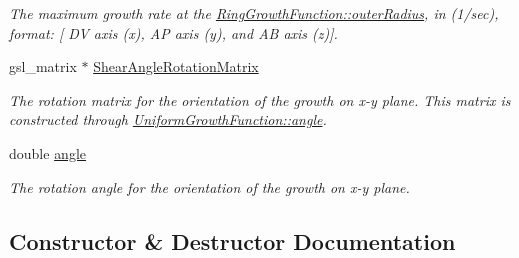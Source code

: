 \begin{DoxyCompactItemize}
\begin{DoxyCompactList}\small\item\em The maximum growth rate at the \hyperlink{classRingGrowthFunction_a8b7d5268d9d47f112b56feef58193649}{Ring\+Growth\+Function\+::outer\+Radius}, in (1/sec), format\+: \mbox{[} D\+V axis (x), A\+P axis (y), and A\+B axis (z)\mbox{]}. \end{DoxyCompactList}\item 
\hypertarget{classRingGrowthFunction_a9603e5de21f7bca0c23deff2c1e9efd6}{}gsl\+\_\+matrix $\ast$ \hyperlink{classRingGrowthFunction_a9603e5de21f7bca0c23deff2c1e9efd6}{Shear\+Angle\+Rotation\+Matrix}\label{classRingGrowthFunction_a9603e5de21f7bca0c23deff2c1e9efd6}

\begin{DoxyCompactList}\small\item\em The rotation matrix for the orientation of the growth on x-\/y plane. This matrix is constructed through \hyperlink{classUniformGrowthFunction_a1a985ff52f9796688e00942b4d3349f8}{Uniform\+Growth\+Function\+::angle}. \end{DoxyCompactList}\item 
\hypertarget{classRingGrowthFunction_add6283d1ad999925c4202a3fa66b76ea}{}double \hyperlink{classRingGrowthFunction_add6283d1ad999925c4202a3fa66b76ea}{angle}\label{classRingGrowthFunction_add6283d1ad999925c4202a3fa66b76ea}

\begin{DoxyCompactList}\small\item\em The rotation angle for the orientation of the growth on x-\/y plane. \end{DoxyCompactList}\end{DoxyCompactItemize}


\subsection{Constructor \& Destructor Documentation}
\hypertarget{classRingGrowthFunction_a6d4914efe62137aae9fec55401edf986}{}
